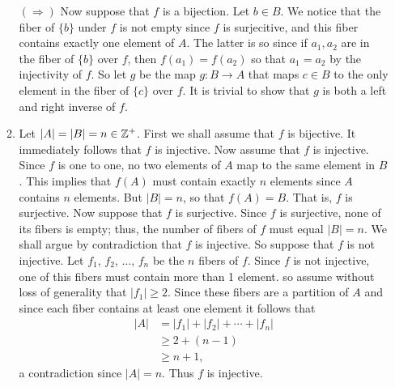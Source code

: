 \begin{enumerate}
\begin{enumerate}
               $(\Rightarrow)$ Now suppose that $f$ is a bijection. Let
               $b \in B$. We notice that the fiber of $\{b\}$ under $f$ is not 
               empty since $f$ is surjecitive, and this fiber contains exactly 
               one element of $A$. The latter is so since if $a_1, a_2$ are in 
               the fiber of $\{b\}$ over $f$, then $f(a_1) = f(a_2)$ so that 
               $a_1 = a_2$ by the injectivity of $f$. So let $g$ be the map
               $g : B \rightarrow A$ that maps $c \in B$ to the only element in 
               the fiber of $\{c\}$ over $f$. It is trivial to show that $g$ is 
               both a left and right inverse of $f$.

         \item Let $|A| = |B| = n \in \mathbb{Z}^+$. First we shall assume that $f$ is
               bijective. It immediately follows that $f$ is injective. Now 
               assume that $f$ is injective. Since $f$ is one to one, no two 
               elements of $A$ map to the same element in $B$. This implies that
               $f(A)$ must contain exactly $n$ elements since $A$ contains $n$ 
               elements. But $|B| = n$, so that $f(A) = B$. That is, $f$ is 
               surjective. Now suppose that $f$ is surjective. Since $f$ is
               surjective, none of its fibers is empty; thus, the number of
               fibers of $f$ must equal $|B| = n$. We shall argue by    
               contradiction that $f$ is injective. So suppose that $f$ is not
               injective. Let $f_1$, $f_2$, $\ldots$, $f_n$ be the $n$ fibers of
               $f$. Since $f$ is not injective, one of this fibers must contain
               more than 1 element. so assume without loss of generality that
               $|f_1| \ge 2$. Since these fibers are a partition of $A$ and
               since each fiber contains at least one element it follows that
               \begin{align*}
                  |A| &= |f_1| + |f_2| + \cdots + |f_n| \\
                      &\ge 2 + (n - 1) \\
                      &\ge n + 1,
               \end{align*}
               a contradiction since $|A| = n$. Thus $f$ is injective.	
      \end{enumerate}
\end{enumerate}
